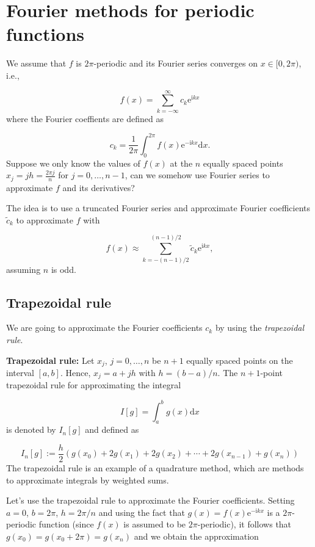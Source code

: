 \documentclass[12pt,a4paper]{article}
\begin{document}
\section{Fourier methods for periodic functions}
We assume that $f$ is $2\pi$-periodic and its Fourier series converges on $x \in [0, 2\pi)$, i.e.,

\[
f(x) = \sum_{k=-\infty}^{\infty} c_k \mathrm{e}^{\mathrm{i} k x}
\]
where the Fourier coeffients are defined as

\[
c_k = \frac{1}{2\pi}\int_{0}^{2\pi} f(x) \mathrm{e}^{-\mathrm{i}k x} \mathrm{d} x.
\]
Suppose we only know the values of $f(x)$ at the $n$ equally spaced points $x_{j} = jh = \frac{2\pi j}{n}$ for $j = 0, \ldots, n-1$, can we somehow use Fourier series to approximate $f$ and its derivatives?

The idea is to use a truncated Fourier series and approximate Fourier coefficients $\widetilde{c}_k$ to approximate $f$ with

\[
f(x) \approx \sum_{k=-(n-1)/2}^{(n-1)/2} \widetilde{c}_k \mathrm{e}^{\mathrm{i} k x},
\]
assuming $n$ is odd.

\subsection{Trapezoidal rule}
We are going to approximate the Fourier coefficients $c_k$ by using the \emph{trapezoidal rule}.

\textbf{Trapezoidal rule:} Let $x_{j}$, $j = 0, \ldots, n$ be $n+1$ equally spaced points on the interval $[a, b]$. Hence, $x_j = a + jh$ with $h = (b-a)/n$. The $n+1$-point trapezoidal rule for approximating the integral 

\[
I[g] = \int_{a}^{b} g(x) \mathrm{d} x 
\]
is denoted by $I_n[g]$ and defined as

\[
I_n[g] := \frac{h}{2}\left(g(x_0) + 2g(x_1) + 2g(x_2) + \cdots + 2g(x_{n-1}) + g(x_{n})    \right)
\]
The trapezoidal rule is an example of a quadrature method, which are methods to approximate integrals by weighted sums.

Let's use the trapezoidal rule to approximate the Fourier coefficients.  Setting $a = 0$, $b = 2\pi$, $h = 2\pi/n$ and using the fact that $g(x) = f(x)\mathrm{e}^{-\mathrm{i}k x}$ is a $2\pi$-periodic function (since $f(x)$ is assumed to be $2\pi$-periodic), it follows that $g(x_0) = g(x_0 + 2\pi) = g(x_n)$ and we obtain the approximation
\end{document}
